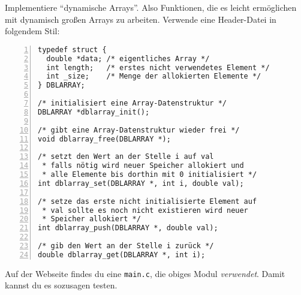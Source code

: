 \begin{aufg}
Implementiere "`dynamische Arrays"'. Also Funktionen, die es leicht ermöglichen mit dynamisch großen Arrays zu arbeiten. Verwende eine Header-Datei in folgendem Stil:
\begin{codelisting}
\begin{lstlisting}[numbers=left,numberstyle=\tiny,frame=tlrb]
typedef struct {
  double *data; /* eigentliches Array */
  int length;   /* erstes nicht verwendetes Element */
  int _size;    /* Menge der allokierten Elemente */
} DBLARRAY;

/* initialisiert eine Array-Datenstruktur */
DBLARRAY *dblarray_init();

/* gibt eine Array-Datenstruktur wieder frei */
void dblarray_free(DBLARRAY *);

/* setzt den Wert an der Stelle i auf val 
 * falls nötig wird neuer Speicher allokiert und 
 * alle Elemente bis dorthin mit 0 initialisiert */
int dblarray_set(DBLARRAY *, int i, double val);

/* setze das erste nicht initialisierte Element auf 
 * val sollte es noch nicht existieren wird neuer 
 * Speicher allokiert */
int dblarray_push(DBLARRAY *, double val);

/* gib den Wert an der Stelle i zurück */
double dblarray_get(DBLARRAY *, int i);

\end{lstlisting}
\end{codelisting}
Auf der Webseite findes du eine \verb|main.c|, die obiges Modul \emph{verwendet}. Damit kannst du es sozusagen testen.
\end{aufg}